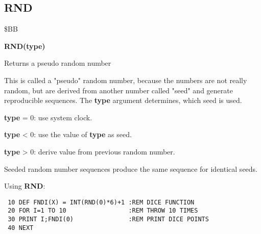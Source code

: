 \subsection{RND}
\begin{description}[leftmargin=2cm,style=nextline]
\item [Token:] \$BB
\item [Format:] {\bf RND(type)}
\item [Usage:] Returns a pseudo random number

               This is called a "pseudo" random number, because
               the numbers are not really random, but are derived
               from another number called "seed" and generate
               reproducible sequences. The {\bf type}
               argument determines, which seed is used.

               {\bf type} = 0: use system clock.

               {\bf type} < 0: use the value of {\bf type} as seed.

               {\bf type} > 0: derive value from previous random number.

\item [Remarks:] Seeded random number sequences produce the same
                 sequence for identical seeds.
\item [Example:] Using {\bf RND}:
\begin{tcolorbox}[colback=black,coltext=white]
\verbatimfont{\codefont}
\begin{verbatim}
 10 DEF FNDI(X) = INT(RND(0)*6)+1 :REM DICE FUNCTION
 20 FOR I=1 TO 10                 :REM THROW 10 TIMES
 30 PRINT I;FNDI(0)               :REM PRINT DICE POINTS
 40 NEXT
\end{verbatim}
\end{tcolorbox}
\end{description}


\newpage
